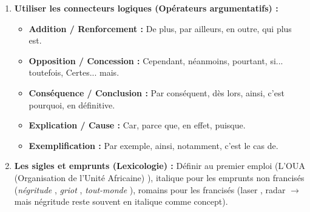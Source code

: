 \documentclass[11pt]{article}
\begin{document}
\begin{methode}
\begin{enumerate}
\begin{itemize}
            \end{itemize}
        \item \textbf{Utiliser les connecteurs logiques (Opérateurs argumentatifs) :}
            \begin{itemize}
                \item \textbf{Addition / Renforcement :} De plus, par ailleurs, en outre, qui plus est.
                \item \textbf{Opposition / Concession :} Cependant, néanmoins, pourtant, si... toutefois, Certes... mais.
                \item \textbf{Conséquence / Conclusion :} Par conséquent, dès lors, ainsi, c'est pourquoi, en définitive.
                \item \textbf{Explication / Cause :} Car, parce que, en effet, puisque.
                \item \textbf{Exemplification :} Par exemple, ainsi, notamment, c'est le cas de.
            \end{itemize}
        \item \textbf{Les sigles et emprunts (Lexicologie) :} Définir au premier emploi (\og L'OUA (Organisation de l'Unité Africaine) \fg), italique pour les emprunts non francisés (\og \emph{négritude} \fg, \og \emph{griot} \fg, \og \emph{tout-monde} \fg), romains pour les francisés (\og laser \fg, \og radar \fg $\rightarrow$ mais \og négritude \fg reste souvent en italique comme concept).
    \end{enumerate}
\end{methode}
\end{document}
